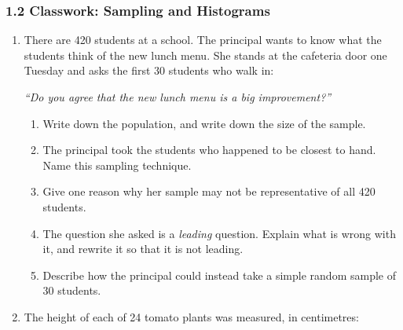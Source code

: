 \documentclass[12pt, twoside]{article}
\begin{document}
\subsubsection*{1.2 Classwork: Sampling and Histograms}

\begin{enumerate}[itemsep=0.15cm]

\item[1.]

There are 420 students at a school. The principal wants to know what
the students think of the new lunch menu. She stands at the cafeteria
door one Tuesday and asks the first 30 students who walk in:

\begin{center}
\emph{``Do you agree that the new lunch menu is a big improvement?''}
\end{center}

\begin{enumerate}[itemsep=0.1cm]
  \item Write down the population, and write down the size of the sample.
  \item The principal took the students who happened to be closest to
  hand. Name this sampling technique.
  \item Give one reason why her sample may not be representative of all
  420 students.
  \item The question she asked is a \emph{leading} question. Explain what
  is wrong with it, and rewrite it so that it is not leading.
  \item Describe how the principal could instead take a simple random
  sample of 30 students.
\end{enumerate}


\newpage

\item[2.]

The height of each of 24 tomato plants was measured, in centimetres:


\end{enumerate}
\end{document}
